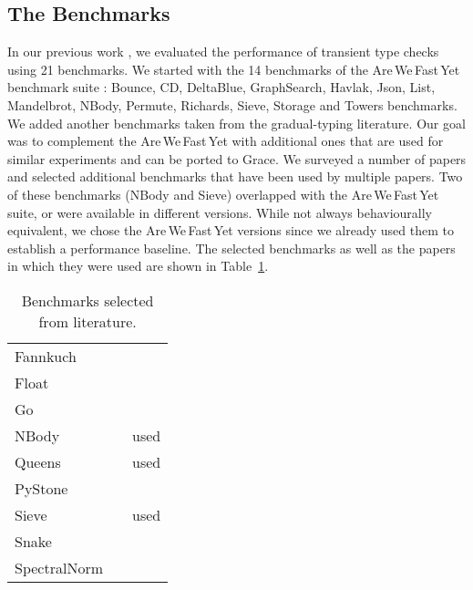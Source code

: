 \documentclass[sigplan,10pt,review,screen]{acmart}\settopmatter{printfolios=true}
\def\AWFY{Are\,We\,Fast\,Yet\xspace}
\begin{document}
\subsection{The Benchmarks}
In our previous work \cite{roberts-and-co-ecoop-2019}, we evaluated the performance of transient type checks using 21 benchmarks. We started with the 14 benchmarks of the \AWFY
benchmark suite \cite{Marr2016}: Bounce, CD, DeltaBlue, GraphSearch, Havlak, Json, List, Mandelbrot, NBody, Permute, Richards, Sieve, Storage and Towers benchmarks. We added another  benchmarks taken from the gradual-typing literature.
Our goal was to complement the \AWFY with additional ones that are used for similar experiments and can be ported to Grace.
We surveyed a number of papers
\citep{Takikawa2016,Vitousek2017,Muehlboeck2017,Bauman2017,Richards2017,Stulova2016,Greenman2018}
and selected additional benchmarks that have been used by multiple papers.
Two of these benchmarks (NBody and Sieve) overlapped with the \AWFY suite,
or were available in different versions.
While not always behaviourally equivalent,
we chose the \AWFY versions since we already used them to
establish a performance baseline.
The selected benchmarks as well as the papers in which they were used are shown in
Table~\ref{tab:gradual-benchmarks}.

\begin{table}[htb]
  \caption{Benchmarks selected from literature.}
  \label{tab:gradual-benchmarks}
  \begin{center}
    \begin{tabular}{l l r}
      Fannkuch & \cite{Vitousek2017,Greenman2018} \\
      Float & \cite{Vitousek2017,Muehlboeck2017,Greenman2018} \\
      Go & \cite{Vitousek2017,Muehlboeck2017,Greenman2018} \\
      NBody & \cite{Kuhlenschmidt:2018:preprint,Vitousek2017,Greenman2018} & used \cite{Marr2016} \\
      Queens & \cite{Vitousek2017,Muehlboeck2017,Greenman2018} & used \cite{Marr2016} \\
      PyStone & \cite{Vitousek2017,Muehlboeck2017,Greenman2018} \\
      Sieve & \cite{Takikawa2016,Muehlboeck2017,Bauman2017,Richards2017,Greenman2019jfp} & used \cite{Marr2016} \\
      Snake & \cite{Takikawa2016,Muehlboeck2017,Bauman2017,Richards2017,Greenman2019jfp} \\
      SpectralNorm & \cite{Vitousek2017,Muehlboeck2017,Greenman2018} \\
    \end{tabular}
  \end{center}
\end{table}
\end{document}
